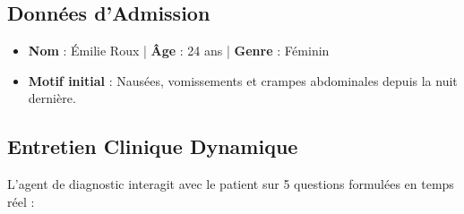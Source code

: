 \documentclass[11pt,a4paper]{report}
\begin{document}
\subsection{Données d'Admission}
\begin{itemize}
    \item \textbf{Nom} : Émilie Roux | \textbf{Âge} : 24 ans | \textbf{Genre} : Féminin
    \item \textbf{Motif initial} : Nausées, vomissements et crampes abdominales depuis la nuit dernière.
\end{itemize}

\subsection{Entretien Clinique Dynamique}
L'agent de diagnostic interagit avec le patient sur 5 questions formulées en temps réel :
\end{document}
